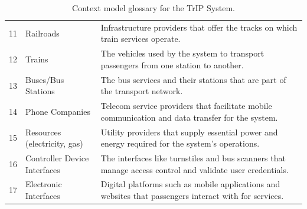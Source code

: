 \begin{table}[H]
\begin{tabular}{@{}clp{9cm}@{}}
11 & Railroads & Infrastructure providers that offer the tracks on which train services operate. \\
12 & Trains & The vehicles used by the system to transport passengers from one station to another. \\
13 & Buses/Bus Stations & The bus services and their stations that are part of the transport network. \\
14 & Phone Companies & Telecom service providers that facilitate mobile communication and data transfer for the system. \\
15 & Resources (electricity, gas) & Utility providers that supply essential power and energy required for the system’s operations. \\
16 & Controller Device Interfaces & The interfaces like turnstiles and bus scanners that manage access control and validate user credentials. \\
17 & Electronic Interfaces & Digital platforms such as mobile applications and websites that passengers interact with for services. \\
\bottomrule
\end{tabular}
\caption{Context model glossary for the TrIP System.}
\label{tab:glossary_context_view}
\end{table}
